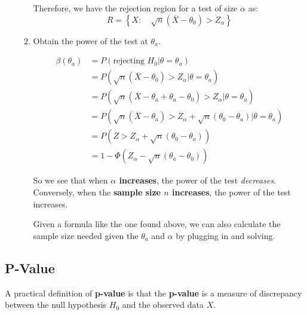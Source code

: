\documentclass{article}
\begin{document}
\begin{enumerate}
\begin{enumerate}
            Therefore, we have the rejection region for a test of size $\alpha$ as:
            \begin{equation*}
                R = \left\{ X: \quad \sqrt{n}\left(\overline{X}-\theta_0\right) > Z_\alpha \right\}
            \end{equation*}
            
            
            \item Obtain the power of the test at $\theta_a$.
            
            \begin{equation*}
                \begin{split}
                    \beta(\theta_a) &= P(\text{rejecting } H_0 | \theta = \theta_a)\\
                    &= P(\sqrt{n} ( \overline{X} - \theta_0) > Z_\alpha | \theta = \theta_a)\\
                    &= P\left( \sqrt{n}(\overline{X}- \theta_a + \theta_a - \theta_0)> Z_\alpha | \theta = \theta_a \right)\\
                    &= P\left(\sqrt{n}(\overline{X}-\theta_a) > Z_\alpha + \sqrt{n} (\theta_0-\theta_a) | \theta = \theta_a \right)\\
                    &= P\left( Z > Z_\alpha + \sqrt{n}(\theta_0 - \theta_a) \right)\\
                    &= 1 - \Phi\left( Z_\alpha - \sqrt{n}(\theta_a - \theta_0) \right)
                \end{split}
            \end{equation*}
            
            So we see that when \textbf{$\alpha$ increases}, the power of the test \textit{decreases}. Conversely, when the \textbf{sample size $n$ increases}, the power of the test increases.
            
            Given a formula like the one found above, we can also calculate the sample size needed given the $\theta_a$ and $\alpha$ by plugging in and solving.
        \end{enumerate}
    \end{enumerate}
    
    \subsection{P-Value}
    
    A practical definition of \textbf{p-value} is that the \textbf{p-value} is a measure of discrepancy between the null hypothesis $H_0$ and the observed data $X$. 
    
\end{document}
